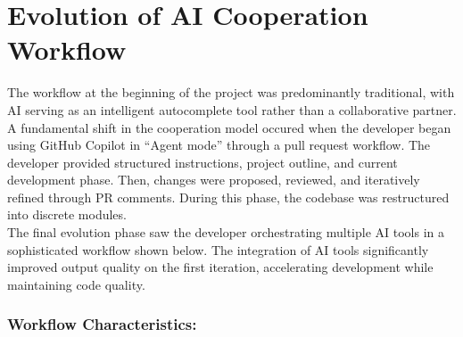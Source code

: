 \documentclass[12pt,a4paper]{article}
\begin{document}
\section{Evolution of AI Cooperation Workflow}

The workflow at the beginning of the project was predominantly traditional, with AI serving as an intelligent autocomplete tool rather than a collaborative partner. \\
A fundamental shift in the cooperation model occured when the developer began using GitHub Copilot in ``Agent mode'' through a pull request workflow. The developer provided structured instructions, project outline, and current development phase. Then, changes were proposed, reviewed, and iteratively refined through PR comments. During this phase, the codebase was restructured into discrete modules. \\
The final evolution phase saw the developer orchestrating multiple AI tools in a sophisticated workflow shown below. The integration of AI tools significantly improved output quality on the first iteration, accelerating development while maintaining code quality.

\subsubsection*{Workflow Characteristics:}
\end{document}
